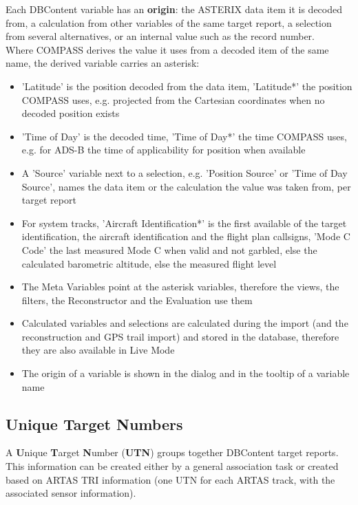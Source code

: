 Each DBContent variable has an \textbf{origin}: the ASTERIX data item it is decoded from, a calculation from other variables of the same target report, a selection from several alternatives, or an internal value such as the record number. \\
Where COMPASS derives the value it uses from a decoded item of the same name, the derived variable carries an asterisk: \\

\begin{itemize}
\item 'Latitude' is the position decoded from the data item, 'Latitude*' the position COMPASS uses, e.g. projected from the Cartesian coordinates when no decoded position exists
\item 'Time of Day' is the decoded time, 'Time of Day*' the time COMPASS uses, e.g. for ADS-B the time of applicability for position when available
\item A 'Source' variable next to a selection, e.g. 'Position Source' or 'Time of Day Source', names the data item or the calculation the value was taken from, per target report
\item For system tracks, 'Aircraft Identification*' is the first available of the target identification, the aircraft identification and the flight plan callsigns, 'Mode C Code' the last measured Mode C when valid and not garbled, else the calculated barometric altitude, else the measured flight level
\item The Meta Variables point at the asterisk variables, therefore the views, the filters, the Reconstructor and the Evaluation use them
\item Calculated variables and selections are calculated during the import (and the reconstruction and GPS trail import) and stored in the database, therefore they are also available in Live Mode
\item The origin of a variable is shown in the  dialog and in the tooltip of a variable name
\end{itemize}

\subsection*{Unique Target Numbers}
A \textbf{U}nique \textbf{T}arget \textbf{N}umber (\textbf{UTN}) groups together DBContent target reports.
This information can be created either by a general association task or created based on ARTAS TRI information (one UTN for each ARTAS track, with the associated sensor information). \\

